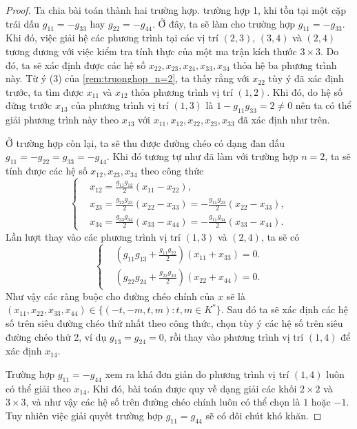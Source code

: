 \begin{proof}
     Ta chia bài toán thành hai trường hợp. trường hợp 1, khi tồn tại một cặp trái dấu \( g_{11} = -g_{33} \) hay \( g_{22} = - g_{44} \). Ở đây, ta sẽ làm cho trường hợp \( g_{11} = -g_{33} \). Khi đó, việc giải hệ các phương trình tại các vị trí \( (2,3) \), \( (3,4) \) và \( (2,4) \) tương đương với việc kiểm tra tính thực của một ma trận kích thước \( 3 \times 3\). Do đó, ta sẽ xác định được các hệ số \( x_{22},x_{23},x_{24}, x_{33},x_{34} \) thỏa hệ ba phương trình này. Từ ý (3) của \cref{rem:truonghop_n=2}, ta thấy rằng với $x_{22}$ tùy ý đã xác định trước, ta tìm được $x_{11}$ và $x_{12}$ thỏa phương trình vị trí $(1,2)$. Khi đó, do hệ số đứng trước $x_{13}$ của phương trình vị trí $(1,3)$ là \( 1 - g_{11} g_{33} = 2 \neq 0 \) nên ta có thể giải phương trình này theo $x_{13}$ với \( x_{11},x_{12},x_{22}, x_{23},x_{33} \) đã xác định như trên.

     Ở trường hợp còn lại, ta sẽ thu được đường chéo có dạng đan dấu \( g_{11} = -g_{22} = g_{33} = - g_{44} \). Khi đó tương tự như đã làm với trường hợp $n = 2$, ta sẽ tính được các hệ số \( x_{12}, x_{23}, x_{34} \) theo công thức
     \[
        \left\{ \begin{aligned}
            & x_{12} = \frac{g_{11} g_{12}}{2} (x_{11} - x_{22}), \\
            & x_{23} = \frac{g_{22} g_{23}}{2} (x_{22} - x_{33}) = -\frac{g_{11}g_{23}}{2} (x_{22} - x_{33}), \\
            & x_{34} = \frac{g_{33} g_{34}}{2} (x_{33} - x_{44}) = -\frac{g_{11}g_{34}}{2} (x_{33} - x_{44}).
        \end{aligned} \right.
     \]
     Lần lượt thay vào các phương trình vị trí $(1,3)$ và $(2,4)$, ta sẽ có
     \[
        \left\{ \begin{aligned}
            & \left( g_{11} g_{13} + \frac{g_{11} g_{22}}{2} \right) (x_{11} + x_{33}) = 0. \\
            & \left( g_{22} g_{24} + \frac{g_{22} g_{33}}{2} \right) (x_{22} + x_{44}) = 0.
        \end{aligned} \right.
     \]
     Như vậy các ràng buộc cho đường chéo chính của $x$ sẽ là $(x_{11},x_{22},x_{33},x_{44})\in\{(-t,-m,t,m):t,m\in K^*\}$. Sau đó ta sẽ xác định các hệ số trên siêu đường chéo thứ nhất theo công thức, chọn tùy ý các hệ số trên siêu đường chéo thứ 2, ví dụ \( g_{13} = g_{24} = 0\), rồi thay vào phương trình vị trí \( (1,4) \) để xác định $x_{14}$. 

Trường hợp $g_{11} = -g_{44}$ xem ra khá đơn giản do phương trình vị trí $(1,4)$ luôn có thể giải theo \( x_{14} \). Khi đó, bài toán được quy về dạng giải các khối \( 2 \times 2\) và \( 3 \times 3\), và như vậy các hệ số trên đường chéo chính luôn có thể chọn là \( 1 \) hoặc \( -1 \). Tuy nhiên việc giải quyết trường hợp $g_{11} = g_{44}$ sẽ có đôi chút khó khăn.


\end{proof}
